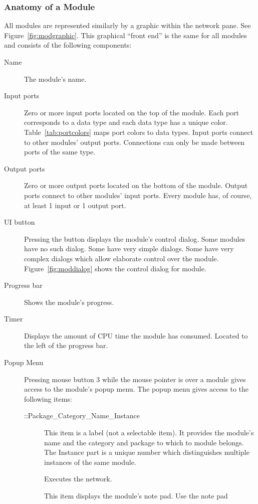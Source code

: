 \subsubsection{Anatomy of a Module}
\label{sec:modanatomy}

All modules are represented similarly by a graphic within the network pane.
See Figure~\ref{fig:modgraphic}. This graphical ``front end'' is the same
for all modules and consists of the following components:

\begin{description}
\item[Name] The module's name.
\item[Input ports] Zero or more input ports located on the top of the
  module.  Each port corresponds to a data type and each data type has a
  unique color.  Table~\ref{tab:portcolors} maps port colors to data types.
  Input ports connect to other modules' output ports.  Connections can only
  be made between ports of the same type.
\item[Output ports] Zero or more output ports located on the bottom of the
  module.  Output ports connect to other modules' input ports.  Every
  module has, of course, at least 1 input or 1 output port.
\item[UI button] Pressing the  button displays the module's
  control dialog. Some modules have no such dialog. Some have very simple
  dialogs.  Some have very complex dialogs which allow elaborate control
  over the module.  Figure~\ref{fig:moddialog} shows the control dialog for
   module.
\item[Progress bar] Shows the module's progress.
\item[Timer] Displays the amount of CPU time the module has consumed.
  Located to the left of the progress bar.
\item[Popup Menu] Pressing mouse button 3 while the mouse
  pointer is over a module gives access to the module's popup menu.  The
  popup menu gives access to the following items:
  \begin{description}
  \item[::Package\_Category\_Name\_Instance] This item is a label (not a
    selectable item).  It provides the module's name and the category and
    package to which to module belongs.  The Instance part is a unique
    number which distinguishes multiple instances of the same module.
  \item[] Executes the network.
  \item[] This item displays the module's note pad.  Use the note pad

\end{description}
\end{description}
